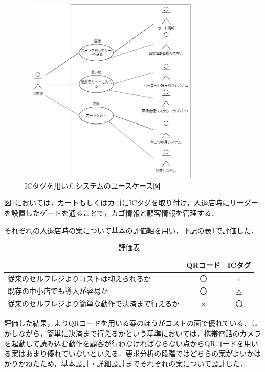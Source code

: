 \begin{figure}[htbp]
\centering
\includegraphics[height = 9cm,width = 9cm]{./picture/usecase_ic.eps}
\caption{ICタグを用いたシステムのユースケース図}
\label{usecase_ic}
\end{figure}

図\ref{usecase_ic}においては，カートもしくはカゴにICタグを取り付け，入退店時にリーダーを設置したゲートを通ることで，カゴ情報と顧客情報を管理する．


それぞれの入退店時の案について基本の評価軸を用い，下記の表\ref{test}で評価した．


\begin{table}[htb]
\begin{center}
\caption{評価表}
\begin{tabular}{|l||c|c|} \hline
 & QRコード & ICタグ \\ \hline \hline
従来のセルフレジよりコストは抑えられるか & 〇 & × \\
既存の中小店でも導入が容易か & 〇 & △ \\
従来のセルフレジより簡単な動作で決済まで行えるか & × & 〇 \\ \hline
\end{tabular}
\label{test}
  \end{center}
\end{table}


評価した結果，よりQRコードを用いる案のほうがコストの面で優れている．しかしながら，簡単に決済まで行えるかという基準においては，携帯電話のカメラを起動して読み込む動作を顧客が行わなければならない点からQRコードを用いる案はあまり優れていないといえる．要求分析の段階ではどちらの案がよいかはかりかねたため，基本設計・詳細設計までそれぞれの案について設計した．

